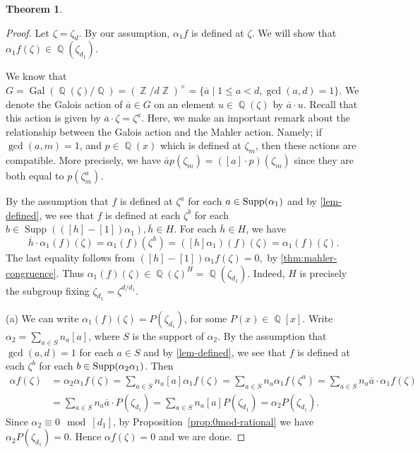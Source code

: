 \documentclass[12t,a4paper]{amsart}
\newtheorem{thm}{Theorem}[section]
\theoremstyle{definition}
\DeclareMathOperator{\Z}{\mathbb{Z}}
\DeclareMathOperator{\Q}{\mathbb{Q}}
\DeclareMathOperator{\Gal}{\text{Gal}}
\DeclareMathOperator{\supp}{{\rm Supp}}
\DeclareMathOperator{\Supp}{\text{Supp}}
\numberwithin{equation}{section}
\begin{document}
{\begin{thm}
\end{thm}

\begin{proof}
Let $\zeta=\zeta_d$. By our assumption, $\alpha_1 f$ is defined at $\zeta$. We will show that $\alpha_1 f(\zeta)\in \Q(\zeta_{d_1})$. 

We know that $G=\Gal(\Q(\zeta)/\Q)=(\Z/d\Z)^\times = \{\overline{a} \mid 1\leq a < d , \gcd(a,d) =1\}.$ We denote the Galois action of $\overline{a}\in G$ on an element $u\in \Q(\zeta)$ by $\overline{a}\cdot u$. Recall that this action is given by $\overline{a}\cdot \zeta =\zeta^a$.  Here, we make an important remark about the relationship between the Galois action and the Mahler action. Namely; if $\gcd(a, m)=1$, and $p \in \Q(x)$  which is defined at $\zeta_m$, then these actions are compatible. More precisely, we have $\bar{a} p(\zeta_m) =([a] \cdot p )(\zeta_m)$ since they are both equal to $p(\zeta_m^a).$


By the assumption that $f$ is defined at $\zeta^a$ for each $a\in \supp(\alpha_1)$ and by \cref{lem-defined}, we see that $f$ is defined at each $\zeta^{b}$ for each $ b \in \Supp(([h]-[1])\alpha_1), \overline{h} \in H.$ For each $\overline{h}\in H$,  we have
\[
\overline{h}\cdot \alpha_1 (f)(\zeta)=\alpha_1 (f)(\zeta^{h})
=([h]\alpha_1) (f)(\zeta)
=\alpha_1 (f)(\zeta).
\]
 The last equality follows from $([h]-[1])\alpha_1 f(\zeta) = 0,$ by \cref{thm:mahler-congruence}. Thus $\alpha_1(f)(\zeta)\in \Q(\zeta)^{H}= \Q(\zeta_{d_1})$.
 Indeed, $H$ is precisely the subgroup fixing $\zeta_{d_1}=\zeta^{d/d_1}$.

 (a)  We can write $\alpha_1(f)(\zeta)= P(\zeta_{d_1})$, for some $P(x)\in \Q[x]$. 
  Write $\alpha_2=\sum\limits_{a\in S} n_a[a]$, where $S$ is the support of $\alpha_2$. By the assumption that $\gcd(a,d)=1$ for each $a\in S$ and  by \cref{lem-defined}, we see that $f$ is defined at each $\zeta^{b}$ for each $b\in \supp(\alpha_2\alpha_1)$. Then 
\[\begin{aligned}
    \alpha f(\zeta) &= \alpha_2 \alpha_1f(\zeta)= \sum_{a \in S} n_a[a]\alpha_1f(\zeta) = \sum_{a \in S} n_a\alpha_1 f(\zeta^{a})=\sum_{a \in S} n_a \overline{a}\cdot \alpha_1 f(\zeta)\\
    &=\sum_{a \in S} n_a \overline{a} \cdot P(\zeta_{d_1})
    = \sum_{a \in S} n_a [a]P(\zeta_{d_1}) =\alpha_2 P(\zeta_{d_1}).
 \end{aligned}\]
 Since $\alpha_2\equiv 0\mod {[d_1]}$, by Proposition~\ref{prop:0mod-rational} we have $\alpha_2 P(\zeta_{d_1})=0$. Hence $\alpha f(\zeta)=0$ and we are done.


\end{proof}}
\end{document}
